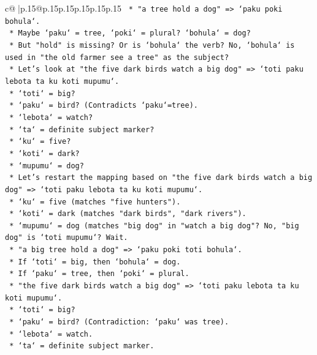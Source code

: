 \documentclass{article}
\begin{document}
{\begin{supertabular}{c@{$\;$}|p{.15\linewidth}@{}p{.15\linewidth}p{.15\linewidth}p{.15\linewidth}p{.15\linewidth}p{.15\linewidth}}
{{{\texttt{        *   "a tree hold a dog" => `paku poki bohula`.} \\
\texttt{            *   Maybe `paku` = tree, `poki` = plural? `bohula` = dog?} \\
\texttt{            *   But "hold" is missing? Or is `bohula` the verb? No, `bohula` is used in "the old farmer see a tree" as the subject?} \\
\texttt{            *   Let's look at "the five dark birds watch a big dog" => `toti paku lebota ta ku koti mupumu`.} \\
\texttt{                *   `toti` = big?} \\
\texttt{                *   `paku` = bird? (Contradicts `paku`=tree).} \\
\texttt{                *   `lebota` = watch?} \\
\texttt{                *   `ta` = definite subject marker?} \\
\texttt{                *   `ku` = five?} \\
\texttt{                *   `koti` = dark?} \\
\texttt{                *   `mupumu` = dog?} \\
\texttt{        *   Let's restart the mapping based on "the five dark birds watch a big dog" => `toti paku lebota ta ku koti mupumu`.} \\
\texttt{            *   `ku` = five (matches "five hunters").} \\
\texttt{            *   `koti` = dark (matches "dark birds", "dark rivers").} \\
\texttt{            *   `mupumu` = dog (matches "big dog" in "watch a big dog"? No, "big dog" is `toti mupumu`? Wait.} \\
\texttt{            *   "a big tree hold a dog" => `paku poki toti bohula`.} \\
\texttt{                *   If `toti` = big, then `bohula` = dog.} \\
\texttt{                *   If `paku` = tree, then `poki` = plural.} \\
\texttt{            *   "the five dark birds watch a big dog" => `toti paku lebota ta ku koti mupumu`.} \\
\texttt{                *   `toti` = big?} \\
\texttt{                *   `paku` = bird? (Contradiction: `paku` was tree).} \\
\texttt{                *   `lebota` = watch.} \\
\texttt{                *   `ta` = definite subject marker.} \\
}}}
\end{supertabular}}
\end{document}
